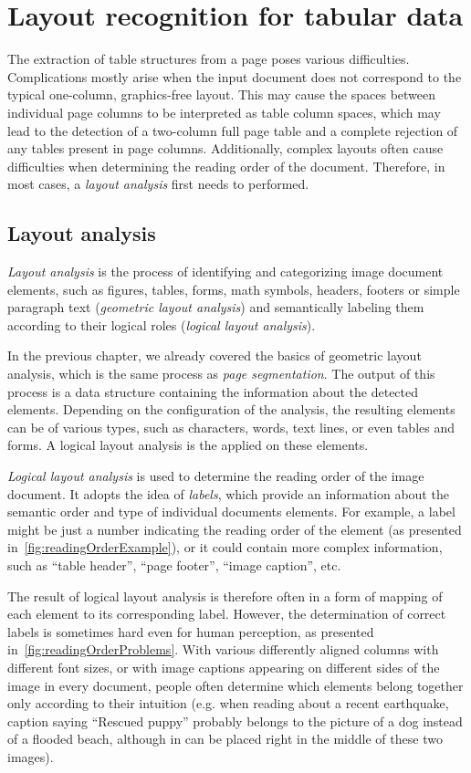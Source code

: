 \chapter{Layout recognition for tabular data}

The extraction of table structures from a page poses various difficulties. Complications mostly arise when the input document does not correspond to the typical one-column, graphics-free layout. This may cause the spaces between individual page columns to be interpreted as table column spaces, which may lead to the detection of a two-column full page table and a complete rejection of any tables present in page columns. Additionally, complex layouts often cause difficulties when determining the reading order of the document. Therefore, in most cases, a \emph{layout analysis} first needs to performed.

\section{Layout analysis}

\emph{Layout analysis} is the process of identifying and categorizing image document elements, such as figures, tables, forms, math symbols, headers, footers or simple paragraph text (\emph{geometric layout analysis}) and semantically labeling them according to their logical roles (\emph{logical layout analysis}).

In the previous chapter, we already covered the basics of geometric layout analysis, which is the same process as \emph{page segmentation}. The output of this process is a data structure containing the information about the detected elements. Depending on the configuration of the analysis, the resulting elements can be of various types, such as characters, words, text lines, or even tables and forms. A logical layout analysis is the applied on these elements.

\emph{Logical layout analysis} is used to determine the reading order of the image document. It adopts the idea of \emph{labels}, which provide an information about the semantic order and type of individual documents elements. For example, a label might be just a number indicating the reading order of the element (as presented in~\cref{fig:readingOrderExample}), or it could contain more complex information, such as ``table header'', ``page footer'', ``image caption'', etc.

The result of logical layout analysis is therefore often in a form of mapping of each element to its corresponding label. However, the determination of correct labels is sometimes hard even for human perception, as presented in~\cref{fig:readingOrderProblems}. With various differently aligned columns with different font sizes, or with image captions appearing on different sides of the image in every document, people often determine which elements belong together only according to their intuition (e.g. when reading about a recent earthquake, caption saying “Rescued puppy” probably belongs to the picture of a dog instead of a flooded beach, although in can be placed right in the middle of these two images).

